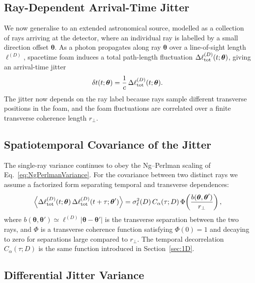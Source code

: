 \documentclass[aps,prd,onecolumn,amsmath,amssymb]{revtex4-2}
\begin{document}
\subsection{Ray-Dependent Arrival-Time Jitter}

We now generalise to an extended astronomical source, modelled as a collection
of rays arriving at the detector, where an individual ray is labelled by a small
direction offset $\boldsymbol{\theta}$.
As a photon propagates along ray $\boldsymbol{\theta}$ over a line-of-sight
length $\ell^{(D)}$, spacetime foam induces a total path-length fluctuation
$\Delta\ell^{(D)}_{\rm tot}(t;\boldsymbol{\theta})$, giving an arrival-time
jitter
\begin{equation}
  \delta t(t;\boldsymbol{\theta})
  = \frac{1}{c}\,\Delta\ell^{(D)}_{\rm tot}(t;\boldsymbol{\theta}).
  \label{eq:jitterExtended}
\end{equation}
The jitter now depends on the ray label because rays sample different transverse
positions in the foam, and the foam fluctuations are correlated over a finite
transverse coherence length $r_\perp$.

\subsection{Spatiotemporal Covariance of the Jitter}

The single-ray variance continues to obey the Ng--Perlman scaling of
Eq.~\eqref{eq:NgPerlmanVariance}.
For the covariance between two distinct rays we assume a factorized form
separating temporal and transverse dependences:
\begin{equation}
  \Big\langle \Delta\ell^{(D)}_{\rm tot}(t;\boldsymbol{\theta})\,
              \Delta\ell^{(D)}_{\rm tot}(t+\tau;\boldsymbol{\theta}')
  \Big\rangle
  = \sigma_\ell^2(D)\,C_\alpha(\tau;D)\,
    \Phi\!\left(\frac{b(\boldsymbol{\theta},\boldsymbol{\theta}')}{r_\perp}\right),
  \label{eq:covExtended}
\end{equation}
where $b(\boldsymbol{\theta},\boldsymbol{\theta}') \simeq
\ell^{(D)}|\boldsymbol{\theta}-\boldsymbol{\theta}'|$ is the transverse
separation between the two rays, and $\Phi$ is a transverse coherence function
satisfying $\Phi(0)=1$ and decaying to zero for separations large compared to
$r_\perp$.
The temporal decorrelation $C_\alpha(\tau;D)$ is the same function introduced
in Section~\ref{sec:1D}.

\subsection{Differential Jitter Variance}
\end{document}
